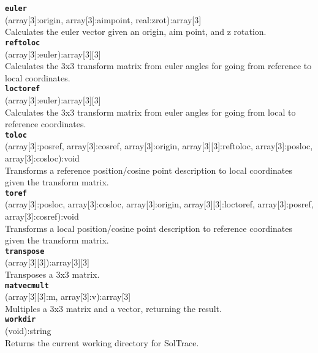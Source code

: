 \documentclass{article}
\begin{document}
{\large \texttt{\textbf{euler}}}\\
\textsf{ (array[3]:origin, array[3]:aimpoint, real:zrot):array[3] }\\
Calculates the euler vector given an origin, aim point, and z rotation.\\

{\large \texttt{\textbf{reftoloc}}}\\
\textsf{ (array[3]:euler):array[3][3] }\\
Calculates the 3x3 transform matrix from euler angles for going from reference to local coordinates.\\

{\large \texttt{\textbf{loctoref}}}\\
\textsf{ (array[3]:euler):array[3][3] }\\
Calculates the 3x3 transform matrix from euler angles for going from local to reference coordinates.\\

{\large \texttt{\textbf{toloc}}}\\
\textsf{ (array[3]:posref, array[3]:cosref, array[3]:origin, array[3][3]:reftoloc, array[3]:posloc, array[3]:cosloc):void }\\
Transforms a reference position/cosine point description to local coordinates given the transform matrix.\\

{\large \texttt{\textbf{toref}}}\\
\textsf{ (array[3]:posloc, array[3]:cosloc, array[3]:origin, array[3][3]:loctoref, array[3]:posref, array[3]:cosref):void }\\
Transforms a local position/cosine point description to reference coordinates given the transform matrix.\\

{\large \texttt{\textbf{transpose}}}\\
\textsf{ (array[3][3]):array[3][3] }\\
Transposes a 3x3 matrix.\\

{\large \texttt{\textbf{matvecmult}}}\\
\textsf{ (array[3][3]:m, array[3]:v):array[3] }\\
Multiples a 3x3 matrix and a vector, returning the result.\\

{\large \texttt{\textbf{workdir}}}\\
\textsf{ (void):string }\\
Returns the current working directory for SolTrace.\\
\end{document}
